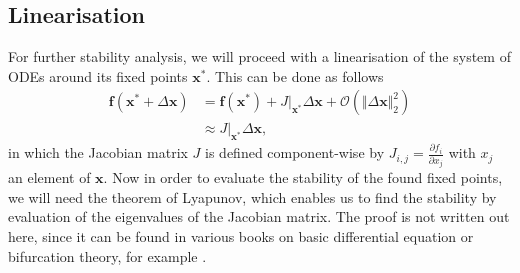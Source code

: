 \subsection{Linearisation}
For further stability analysis, we will proceed with a linearisation of the system of ODEs around its fixed points $\bm{x}^*$. This can be done as follows
\begin{equation}
\begin{aligned}
\bm{f}(\bm{x}^* + \Delta \bm{x}) 
&= \bm{f}( \bm{x}^* ) + J\rvert_{ \bm{x}^* }  \Delta \bm{x}  + \mathcal{O}(\Vert \Delta \bm{x} \Vert^2_2)\\
&\approx J\rvert_{ \bm{x}^* }  \Delta \bm{x},
\end{aligned}
\end{equation} 
in which the Jacobian matrix $J$ is defined component-wise by $J_{i,j} = \frac{\partial f_i}{\partial x_j}$ with $x_j$ an element of $\bm{x}$.
Now in order to evaluate the stability of the found fixed points, we will need the theorem of Lyapunov, which enables us to find the stability by evaluation of the eigenvalues of the Jacobian matrix. The proof is not written out here, since it can be found in various books on basic differential equation or bifurcation theory, for example \cite{Boyce2010, Braun1993}.

